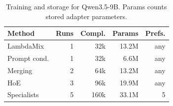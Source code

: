 \begin{table}
\centering\small
\vspace{-20pt}
\caption{Training and storage for Qwen3.5-9B. Params counts stored adapter parameters.}
\label{tab:budget}
\begingroup
\setlength{\tabcolsep}{3pt}
\begin{tabular}{@{}lrrrr@{}}
\toprule
Method & Runs & Compl. & Params & Prefs.\\
\midrule
LambdaMix & 1 & 32k & 13.2M & any\\
Prompt cond. & 1 & 32k & 6.6M & any\\
Merging & 2 & 64k & 13.2M & any\\
HoE & 3 & 96k & 19.9M & any\\
Specialists & 5 & 160k & 33.1M & 5\\
\bottomrule
\end{tabular}
\endgroup
\end{table}